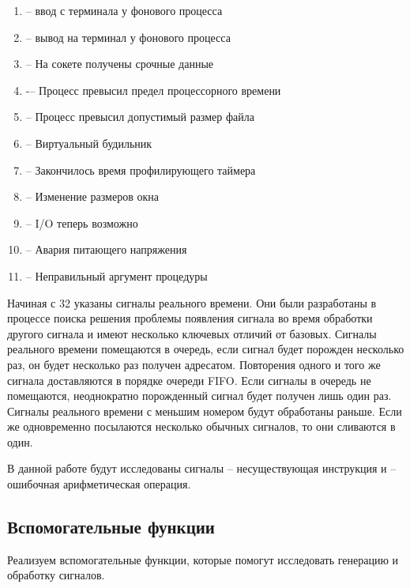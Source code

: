 \begin{enumerate}[itemsep=-0.2em]
	\item {} -- ввод с терминала у фонового процесса
	\item {} -- вывод на терминал у фонового процесса
	\item {} -- На сокете получены срочные данные
	\item {} -– Процесс превысил предел процессорного времени
	\item {} -- Процесс превысил допустимый размер файла
	\item {} -- Виртуальный будильник
	\item {} -- Закончилось время профилирующего таймера
	\item {} -- Изменение размеров окна
	\item {} -- I/O теперь возможно
	\item {} -- Авария питающего напряжения
	\item {} -- Неправильный аргумент процедуры
\end{enumerate}

Начиная с 32 указаны сигналы реального времени. Они были разработаны в процессе поиска решения проблемы появления сигнала во время обработки другого сигнала и имеют несколько ключевых отличий от базовых. Сигналы реального времени помещаются в очередь, если сигнал будет порожден несколько раз, он будет несколько раз получен адресатом. Повторения одного и того же сигнала доставляются в порядке очереди FIFO. Если сигналы в очередь не помещаются, неоднократно порожденный сигнал будет получен лишь один раз. Сигналы реального времени с меньшим номером будут обработаны раньше. Если же одновременно посылаются несколько обычных сигналов, то они сливаются в один.

В данной работе будут исследованы сигналы  -- несуществующая инструкция и  -- ошибочная арифметическая операция.

\subsection{Вспомогательные функции}

Реализуем вспомогательные функции, которые помогут исследовать генерацию и обработку сигналов.





